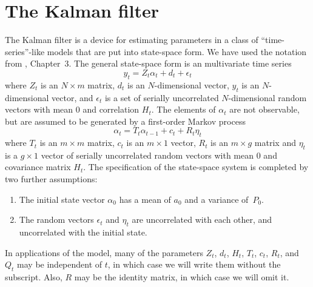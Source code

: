 %
%


\section{The Kalman filter}

The Kalman filter is a device for estimating parameters in
a class of ``time-series''-like models that are put into state-space
form. We have used the 
notation from \cite{harvey1990}, Chapter~3.
The general state-space form is an  multivariate time series
$$y_t=Z_t\alpha_t+d_t+\epsilon_t$$ 
where $Z_t$ is an $N\times m$ matrix, $d_t$ is an $N$-dimensional
vector, $y_t$ is an $N$-dimensional vector, and $\epsilon_t$ is
a set of serially uncorrelated $N$-dimensional random vectors
with mean $0$ and correlation $H_t$.
The elements of $\alpha_t$ are not observable, but are
assumed to be generated by a first-order Markov process
$$\alpha_t=T_t\alpha_{t-1}+c_t+R_t\eta_t$$
where $T_t$ is an $m\times m$ matrix, $c_t$ is an $m\times 1$
vector, $R_t$ is an $m\times g$ matrix and $\eta_t$
is a $g\times 1$ vector of serially uncorrelated 
random vectors with mean $0$ and covariance matrix $H_t$.
The specification of the state-space system is completed by
two further assumptions:
\begin{enumerate}
  \item The initial state vector $\alpha_0$ has a mean of $a_0$ and a 
variance of~$P_0$.
  \item The random vectors $\epsilon_t$ and $\eta_t$ are uncorrelated
with each other, and uncorrelated with the initial state.
\end{enumerate}

In applications of the model, many of the
parameters $Z_t$, $d_t$, $H_t$, $T_t$, $c_t$, $R_t$, and $Q_t$
may be independent of $t$, in which case we will write them
without the subscript. Also, $R$ may be the identity matrix,
in which case we will omit it.

